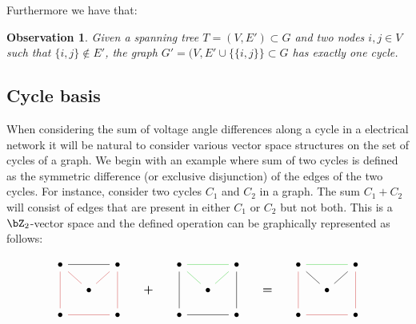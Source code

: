 \documentclass[11pt,a4paper,oneside,openany]{book}
\newtheorem{observation}[theorem]{Observation}
\numberwithin{definition}{section}
\numberwithin{theorem}{section}
\numberwithin{problem}{section}
\begin{document}
Furthermore we have that:
\begin{observation}
    Given a spanning tree $T=(V,E') \subset G$ and two nodes $i,j \in V$ such that $\{i,j\} \notin E'$, the graph $G'=(V,E'\cup\{\{i,j\}\} \subset G$ has exactly one cycle.
\end{observation}

\subsection{Cycle basis}


When considering the sum of voltage angle differences along a cycle in a electrical network it will be natural to consider various vector space structures on the set of cycles of a graph. We begin with an example where sum of two cycles is defined as the symmetric difference (or exclusive disjunction) of the edges of the two cycles. For instance, consider two cycles \(C_1\) and \(C_2\) in a graph. The sum \(C_1 + C_2\) will consist of edges that are present in either \(C_1\) or \(C_2\) but not both. This is a $\bZ_2$-vector space and the defined operation can be graphically represented as follows:

    \[\begin{tikzcd}[ampersand replacement=\&, scale = 0.75, every node/.style={scale=0.75}, row sep=small, column sep=small]
	\bullet \&\& \bullet \&\& \bullet \&\& \bullet \&\& \bullet \&\& \bullet \\
	\& \bullet \&\& {\textbf{+}} \&\& \bullet \&\& {\textbf{=}} \&\& \bullet \\
	\bullet \&\& \bullet \&\& \bullet \&\& \bullet \&\& \bullet \&\& \bullet
	\arrow[color={rgb,255:red,214;green,92;blue,92}, no head, from=3-1, to=1-1]
	\arrow[color={rgb,255:red,214;green,92;blue,92}, no head, from=3-3, to=3-1]
	\arrow[color={rgb,255:red,214;green,92;blue,92}, no head, from=3-3, to=1-3]
	\arrow[no head, from=1-3, to=1-1]
	\arrow[color={rgb,255:red,214;green,92;blue,92}, no head, from=1-1, to=2-2]
	\arrow[color={rgb,255:red,214;green,92;blue,92}, no head, from=2-2, to=1-3]
	\arrow[color={rgb,255:red,92;green,214;blue,92}, no head, from=1-7, to=2-6]
	\arrow[no head, from=1-7, to=3-7]
	\arrow[no head, from=3-7, to=3-5]
	\arrow[no head, from=3-5, to=1-5]
	\arrow[color={rgb,255:red,92;green,214;blue,92}, no head, from=1-5, to=1-7]
	\arrow[color={rgb,255:red,92;green,214;blue,92}, no head, from=1-5, to=2-6]
	\arrow[color={rgb,255:red,214;green,92;blue,92}, no head, from=3-9, to=1-9]
	\arrow[color={rgb,255:red,92;green,214;blue,92}, no head, from=1-9, to=1-11]
	\arrow[color={rgb,255:red,214;green,92;blue,92}, no head, from=1-11, to=3-11]
	\arrow[color={rgb,255:red,214;green,92;blue,92}, no head, from=3-11, to=3-9]
	\arrow[no head, from=1-9, to=2-10]
	\arrow[no head, from=2-10, to=1-11]
\end{tikzcd}\]
\end{document}
